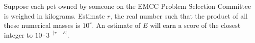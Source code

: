Suppose each pet owned by someone on the EMCC Problem Selection Committee is weighed in kilograms. Estimate $r$, the real number such that the product of all these numerical masses is $10^r$. An estimate of $E$ will earn a score of the closest integer to $10 \cdot 3^{-|r-E|}$.
